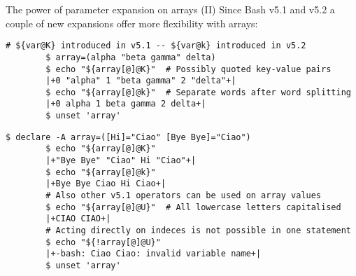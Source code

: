 \begin{frame}[fragile]{The power of parameter expansion on arrays (II)}
    \vspace{-3mm}
    Since Bash v5.1 and v5.2 a couple of new expansions offer more flexibility with arrays:
    \begin{lstlisting}[style=MyBash, aboveskip=3mm, xrightmargin=2mm]
        # ${var@K} introduced in v5.1 -- ${var@k} introduced in v5.2
        $ array=(alpha "beta gamma" delta)
        $ echo "${array[@]@K}"  # Possibly quoted key-value pairs
        |+0 "alpha" 1 "beta gamma" 2 "delta"+|
        $ echo "${array[@]@k}"  # Separate words after word splitting
        |+0 alpha 1 beta gamma 2 delta+|
        $ unset 'array'
    \end{lstlisting}
    \begin{lstlisting}[style=MyBash, aboveskip=3mm, xrightmargin=2mm, firstnumber=8]
        $ declare -A array=([Hi]="Ciao" [Bye Bye]="Ciao")
        $ echo "${array[@]@K}"
        |+"Bye Bye" "Ciao" Hi "Ciao"+|
        $ echo "${array[@]@k}"
        |+Bye Bye Ciao Hi Ciao+|
        # Also other v5.1 operators can be used on array values
        $ echo "${array[@]@U}"  # All lowercase letters capitalised
        |+CIAO CIAO+|
        # Acting directly on indeces is not possible in one statement
        $ echo "${!array[@]@U}"
        |+-bash: Ciao Ciao: invalid variable name+|
        $ unset 'array'
    \end{lstlisting}
\end{frame}




